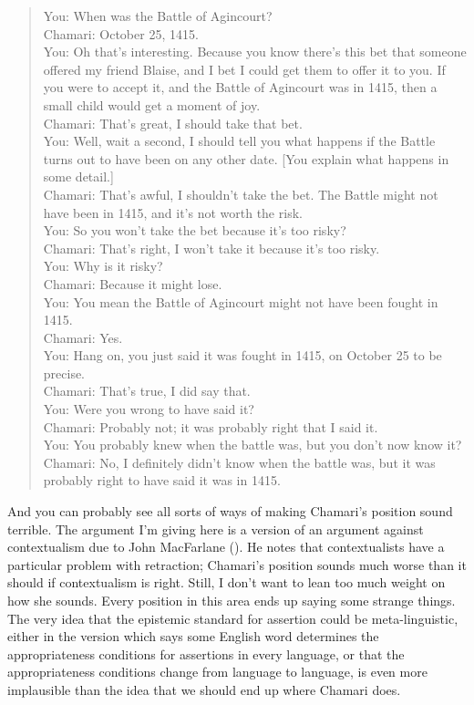 \documentclass[
  10pt,
  letterpaper,
  twoside]{scrbook}
\begin{document}
\begin{quote}
You: When was the Battle of Agincourt?\\
Chamari: October 25, 1415.\\
You: Oh that's interesting. Because you know there's this bet that
someone offered my friend Blaise, and I bet I could get them to offer it
to you. If you were to accept it, and the Battle of Agincourt was in
1415, then a small child would get a moment of joy.\\
Chamari: That's great, I should take that bet.\\
You: Well, wait a second, I should tell you what happens if the Battle
turns out to have been on any other date. {[}You explain what happens in
some detail.{]}\\
Chamari: That's awful, I shouldn't take the bet. The Battle might not
have been in 1415, and it's not worth the risk.\\
You: So you won't take the bet because it's too risky?\\
Chamari: That's right, I won't take it because it's too risky.\\
You: Why is it risky?\\
Chamari: Because it might lose.\\
You: You mean the Battle of Agincourt might not have been fought in
1415.\\
Chamari: Yes.\\
You: Hang on, you just said it was fought in 1415, on October 25 to be
precise.\\
Chamari: That's true, I did say that.\\
You: Were you wrong to have said it?\\
Chamari: Probably not; it was probably right that I said it.\\
You: You probably knew when the battle was, but you don't now know it?\\
Chamari: No, I definitely didn't know when the battle was, but it was
probably right to have said it was in 1415.
\end{quote}

And you can probably see all sorts of ways of making Chamari's position
sound terrible. The argument I'm giving here is a version of an argument
against contextualism due to John MacFarlane
(). He notes that
contextualists have a particular problem with retraction; Chamari's
position sounds much worse than it should if contextualism is right.
Still, I don't want to lean too much weight on how she sounds. Every
position in this area ends up saying some strange things. The very idea
that the epistemic standard for assertion could be meta-linguistic,
either in the version which says some English word determines the
appropriateness conditions for assertions in every language, or that the
appropriateness conditions change from language to language, is even
more implausible than the idea that we should end up where Chamari does.
\end{document}
